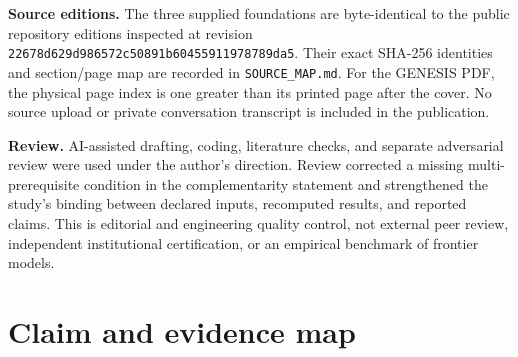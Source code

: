 \textbf{Source editions.} The three supplied foundations are byte-identical to the public repository editions inspected at revision \texttt{22678d629d986572c50891b60455911978789da5}. Their exact SHA-256 identities and section/page map are recorded in \texttt{SOURCE\_MAP.md}. For the GENESIS PDF, the physical page index is one greater than its printed page after the cover. No source upload or private conversation transcript is included in the publication.

\textbf{Review.} AI-assisted drafting, coding, literature checks, and separate adversarial review were used under the author's direction. Review corrected a missing multi-prerequisite condition in the complementarity statement and strengthened the study's binding between declared inputs, recomputed results, and reported claims. This is editorial and engineering quality control, not external peer review, independent institutional certification, or an empirical benchmark of frontier models.

\section{Claim and evidence map}
\label{app:claims}

